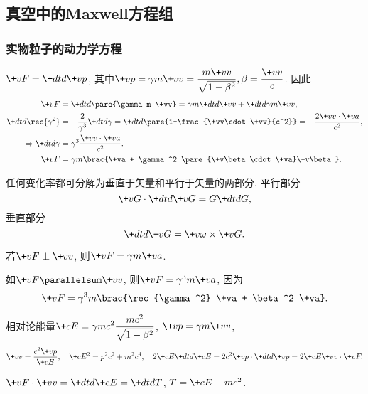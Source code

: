 \documentclass[hidelinks]{ctexart}
\begin{document}


\subsection{真空中的Maxwell方程组} %
\label{sub:真空中的maxwell方程组}

\subsubsection{实物粒子的动力学方程} %
\label{ssub:实物粒子的动力学方程}

$\displaystyle \+vF = \+dtd{\+vp}$, 其中$\displaystyle \+vp = \gamma m\+vv = \frac{m\+vv}{\sqrt{1-\beta^2}}, \beta = \frac{\+vv}{c}$. 因此
\begin{align*}
    \+vF &= \+dtd{}\pare{\gamma m \+vv} = \gamma m\+dtd{\+vv} + \+dtd{\gamma}m\+vv,\\
    \+dtd{}\rec{\gamma^2} &= -\frac{2}{\gamma^3} \+dtd{\gamma} = \+dtd{}\pare{1-\frac{\+vv\cdot \+vv}{c^2}} = -\frac{2\+vv\cdot \+va}{c^2},\\
    \Rightarrow \+dtd{\gamma} &= \gamma^3 \frac{\+vv\cdot \+va}{c^2}. \\
    \+vF &=  \gamma m\brac{\+va + \gamma^2 \pare{\+v\beta \cdot \+va}\+v\beta}.
\end{align*}
\begin{figure}[ht]
    \centering
\end{figure}
任何变化率都可分解为垂直于矢量和平行于矢量的两部分, 平行部分
\[ \+vG \cdot \+dtd{\+vG} = G\+dtdG, \]
垂直部分
\[ \+dtd{\+vG} = \+v\omega \times \+vG. \]
\begin{cenum}
    \item 若$\+vF\perp \+vv$, 则$\+vF = \gamma m\+va$.
    \item 如$\+vF\parallelsum \+vv$, 则$\+vF = \gamma^3 m\+va$, 因为
    \[ \+vF = \gamma^3 m\brac{\rec{\gamma^2} \+va + \beta^2 \+va}. \]
    \item 相对论能量$\displaystyle \+cE = \gamma mc^2 \frac{mc^2}{\sqrt{1-\beta^2}}$, $\+vp = \gamma m\+vv$,
\[ \+vv = \frac{c^2 \+vp}{\+cE},\quad \+cE^2 = p^2c^2 + m^2c^4,\quad 2\+cE\+dtd{\+cE} = 2c^2 \+vp\cdot \+dtd{\+vp} = 2\+cE\+vv\cdot \+vF. \]
    \item $\displaystyle \+vF \cdot \+vv = \+dtd{\+cE} = \+dtd{T}$, $T = \+cE-mc^2$.
\end{cenum}

\end{document}
